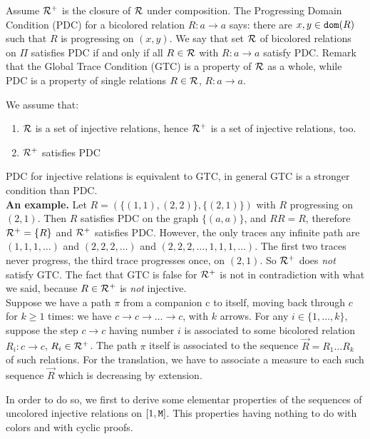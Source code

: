\documentclass{lmcs}
\begin{document}
Assume ${\mathcal R}^+$ is the closure of ${\mathcal R}$ under composition. The Progressing Domain 
Condition (PDC) for a bicolored relation $R : a \rightarrow a$ says: 
there are $x, y \in {\tt dom}(R)$ such that $R$ is progressing on $(x,y)$.
We say that set ${\mathcal R}$ of bicolored relations on $\Pi$
satisfies PDC if and only if all $R \in {\mathcal R}$ with $R: a \rightarrow a$ satisfy PDC. 
Remark that the Global Trace Condition (GTC) is a property of ${\mathcal R}$ as a whole, 
while PDC is a property of single relations $R \in {\mathcal R}$, $R:a \rightarrow a$. 

We assume that:

\begin{enumerate}
\item  
${\mathcal R}$ is a set of injective relations, hence ${\mathcal R}^+$ is a set of injective relations, too.
\item
${\mathcal R}^+$ satisfies PDC 
\end{enumerate}

PDC for injective relations is equivalent to GTC, in general GTC is a stronger condition
than PDC. 
\\

{\bf An example.} Let $R = (\{(1,1),(2,2)\},\{(2,1)\})$ with $R$ progressing
on $(2,1)$. Then $R$ satisfies PDC on the graph $\{(a,a)\}$, and $RR=R$, 
therefore  ${\mathcal R}^+=\{R\}$ and ${\mathcal R}^+$ satisfies PDC. However, the only traces any
infinite path are $(1,1,1,\ldots)$ and $(2,2,2,\ldots)$ and $(2,2,2,\ldots,1,1,1,\ldots)$. The
first two traces never progress, the third trace progresses once, on $(2,1)$. So ${\mathcal R}^+$
does \emph{not} satisfy GTC. The fact that GTC is false for ${\mathcal R}^+$ 
is not in contradiction with what we said, because $R \in {\mathcal R}^+$ is  \emph{not} injective.
\\

Suppose we have a path $\pi$ from a companion c to itself, moving back  through $c$
for $k \ge 1$ times: we have $c \rightarrow c \rightarrow \ldots \rightarrow c$, with $k$ arrows.
For any $i \in \{1, \ldots, k\}$, suppose the step $c \rightarrow c$ having number $i$
is associated to some bicolored relation $R_i : c \rightarrow c$, $R_i \in {\mathcal R}^+$. 
The path $\pi$ itself is associated to the sequence $\vec{R} = R_1 \ldots R_k$ of such relations. 
For the translation, we have to associate a measure to each such sequence $\vec{R}$
which is decreasing by extension.

In order to do so, we first to derive some elementar properties of the sequences of uncolored injective relations on $[1,{\tt M}]$. This properties having nothing to do with colors and
with cyclic proofs.
\end{document}
